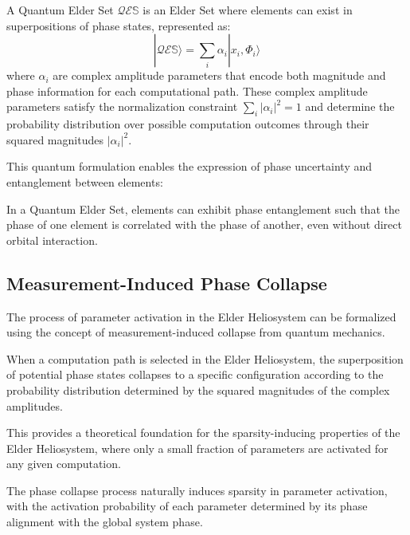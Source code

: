 \begin{definition}
A Quantum Elder Set $\mathcal{Q}\mathcal{E}\mathbb{S}$ is an Elder Set where elements can exist in superpositions of phase states, represented as:
\begin{equation}
|\mathcal{Q}\mathcal{E}\mathbb{S}\rangle = \sum_i \alpha_i |x_i, \Phi_i\rangle
\end{equation}
where $\alpha_i$ are complex amplitude parameters that encode both magnitude and phase information for each computational path. These complex amplitude parameters satisfy the normalization constraint $\sum_i |\alpha_i|^2 = 1$ and determine the probability distribution over possible computation outcomes through their squared magnitudes $|\alpha_i|^2$.
\end{definition}

This quantum formulation enables the expression of phase uncertainty and entanglement between elements:

\begin{theorem}
In a Quantum Elder Set, elements can exhibit phase entanglement such that the phase of one element is correlated with the phase of another, even without direct orbital interaction.
\end{theorem}

\subsection{Measurement-Induced Phase Collapse}

The process of parameter activation in the Elder Heliosystem can be formalized using the concept of measurement-induced collapse from quantum mechanics.

\begin{definition}
When a computation path is selected in the Elder Heliosystem, the superposition of potential phase states collapses to a specific configuration according to the probability distribution determined by the squared magnitudes of the complex amplitudes.
\end{definition}

This provides a theoretical foundation for the sparsity-inducing properties of the Elder Heliosystem, where only a small fraction of parameters are activated for any given computation.

\begin{corollary}
The phase collapse process naturally induces sparsity in parameter activation, with the activation probability of each parameter determined by its phase alignment with the global system phase.
\end{corollary}


